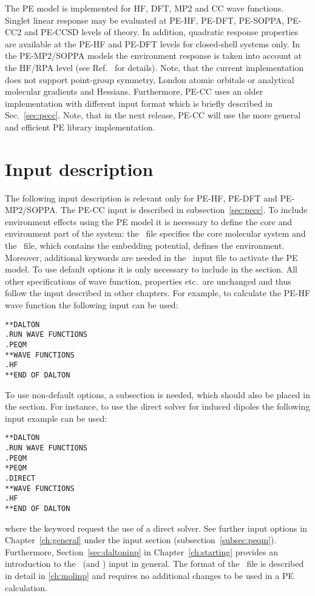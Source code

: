 The PE model is implemented for HF, DFT, MP2 and
CC wave functions. Singlet linear response may be evaluated
at PE-HF, PE-DFT, PE-SOPPA, PE-CC2 and
PE-CCSD levels of theory. In addition, quadratic response
properties are available at the PE-HF and PE-DFT levels for closed-shell
systems only. In the PE-MP2/SOPPA models the environment response is
taken into account at the HF/RPA level (see Ref.~\cite{pesoppa} for details). 
Note, that the current implementation 
does not support point-group symmetry, London atomic orbitals or analytical 
molecular gradients and Hessians. Furthermore, PE-CC uses 
an older implementation with different input format which is briefly described 
in Sec.~\ref{sec:pecc}. Note, that in the next release, PE-CC will use the
more general and efficient PE library implementation.


\section{Input description}
The following input description is relevant only for PE-HF, PE-DFT and 
PE-MP2/SOPPA. The PE-CC input is described in subsection~\ref{sec:pecc}. To 
include environment effects using the PE model it is 
necessary to define the core and environment part of the system: the \molinp\ 
file specifies the core molecular system and the \potinp\ file, which contains 
the embedding potential, defines the environment. Moreover, additional 
keywords are needed in the \dalinp\ input file to activate the PE model. To use 
default options it is only necessary to include \Key{PEQM} in the \Sec{*DALTON} 
section. All other specifications of wave function, properties etc.\ are
unchanged and thus follow the input described in other chapters. For example, to
calculate the PE-HF wave function the following input can be used:
\begin{verbatim}
**DALTON
.RUN WAVE FUNCTIONS
.PEQM
**WAVE FUNCTIONS
.HF
**END OF DALTON
\end{verbatim}
To use non-default options, a  subsection is needed, which should also be placed in the 
\Sec{*DALTON} section. For instance, to use the direct solver for induced 
dipoles the following input example can be used:
\begin{verbatim}
**DALTON
.RUN WAVE FUNCTIONS
.PEQM
*PEQM
.DIRECT
**WAVE FUNCTIONS
.HF
**END OF DALTON
\end{verbatim}
where the  keyword request the use of a direct solver. See further
input options in Chapter~\ref{ch:general} under the \Sec{PEQM} 
input section (subsection~\ref{subsec:peqm}). Furthermore, 
Section~\ref{sec:daltoninp} in Chapter~\ref{ch:starting} provides an 
introduction to the \dalton\ (and \molinp) input in general. The format of the
\molinp\ file is described in detail in \ref{ch:molinp} and requires no
additional changes to be used in a PE calculation.

